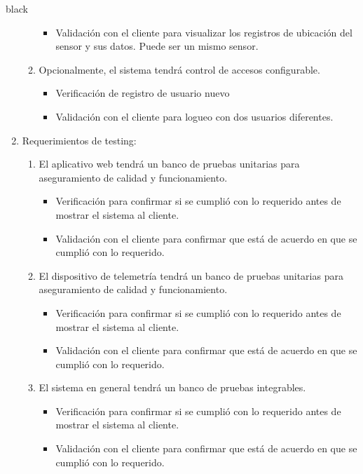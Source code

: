 \documentclass[
11pt, %
codirector, %
]{charter}
\begin{document}
\begin{consigna}{black}
\begin{enumerate}
\begin{enumerate}
\begin{itemize}
				\item Validación con el cliente para visualizar los registros de ubicación del sensor y sus datos. Puede ser un mismo sensor.
			\end{itemize}
		\item Opcionalmente, el sistema tendrá control de accesos configurable.
			\begin{itemize}
				\item Verificación de registro de usuario nuevo 
				\item Validación con el cliente para logueo con dos usuarios diferentes.
			\end{itemize}
	\end{enumerate}

\item Requerimientos de testing:
	\begin{enumerate}
		\item El aplicativo web tendrá un banco de pruebas unitarias para aseguramiento de calidad y funcionamiento.
			\begin{itemize}
				\item Verificación para confirmar si se cumplió con lo requerido antes de mostrar el sistema al cliente.
				\item Validación con el cliente para confirmar que está de acuerdo en que se cumplió con lo requerido. 
			\end{itemize}
		\item El dispositivo de telemetría tendrá un banco de pruebas unitarias para aseguramiento de calidad y funcionamiento.
			\begin{itemize}
				\item Verificación para confirmar si se cumplió con lo requerido antes de mostrar el sistema al cliente. 
				\item Validación con el cliente para confirmar que está de acuerdo en que se cumplió con lo requerido.  
			\end{itemize}
		\item El sistema en general tendrá un banco de pruebas integrables.
			\begin{itemize}
				\item Verificación para confirmar si se cumplió con lo requerido antes de mostrar el sistema al cliente. 
				\item Validación con el cliente para confirmar que está de acuerdo en que se cumplió con lo requerido. 
			\end{itemize}
	\end{enumerate}


\end{enumerate}
\end{consigna}
\end{document}
